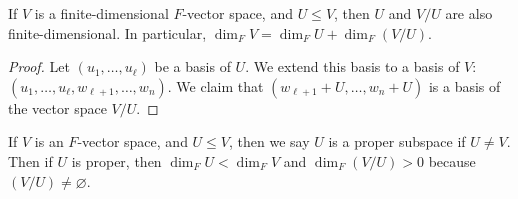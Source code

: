     \begin{proposition} \label{prp:quotientdim}
        If $V$ is a finite-dimensional $F$-vector space, and $U \leq V$, then $U$ and $V / U$ are also finite-dimensional.
        In particular, $\dim_F V = \dim_F U + \dim_F (V / U)$.
    \end{proposition}
    \begin{proof}
        Let $(u_1, \dots, u_\ell)$ be a basis of $U$.
        We extend this basis to a basis of $V$: $(u_1, \dots, u_\ell, w_{\ell + 1}, \dots, w_n)$.
        We claim that $(w_{\ell + 1} + U, \dots, w_n + U)$ is a basis of the vector space $V / U$.
    \end{proof}

    \begin{remark}
        If $V$ is an $F$-vector space, and $U \leq V$, then we say $U$ is a proper subspace if $U \neq V$.
        Then if $U$ is proper, then $\dim_F U < \dim_F V$ and $\dim_F ( V / U ) > 0$ because $(V/U) \neq \varnothing$.
    \end{remark}

